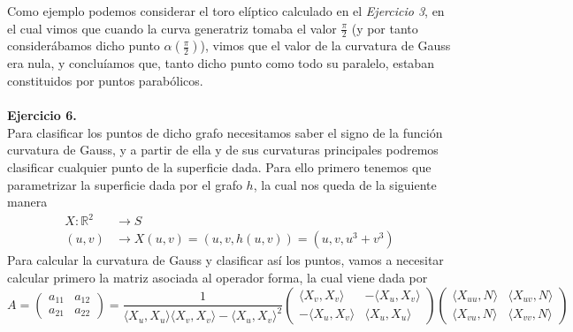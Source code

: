\documentclass[fleqn]{article}
\def\R{\mathds{R}}
\begin{document}
    Como ejemplo podemos considerar el toro elíptico calculado en el \textit{Ejercicio 3}, en el cual vimos que 
    cuando la curva generatriz tomaba el valor $\frac{\pi}{2}$ (y por tanto considerábamos dicho punto $\alpha(\frac{\pi}{2})$), vimos que el valor de la curvatura de Gauss era nula, y concluíamos
    que, tanto dicho punto como todo su paralelo, estaban constituidos por puntos parabólicos. \\ \\

    \textbf{Ejercicio 6. } \\

    Para clasificar los puntos de dicho grafo necesitamos saber el signo de la función curvatura de Gauss, y a partir de ella y de sus curvaturas principales podremos clasificar cualquier punto
    de la superficie dada. Para ello primero tenemos que parametrizar la superficie dada por el grafo $h$, la cual nos queda de la siguiente manera
    \begin{equation*}
        \begin{aligned}
            X: \R^2 &\longrightarrow S \\
            (u,v) &\longrightarrow X(u, v) = (u, v, h(u,v)) = (u, v, u^3 + v^3)
        \end{aligned}
    \end{equation*}
    Para calcular la curvatura de Gauss y clasificar así los puntos, vamos a necesitar calcular primero la matriz asociada al operador forma, la cual viene dada por 
    \begin{equation*}
        A =
        \begin{pmatrix}
            a_{11} & a_{12} \\
            a_{21} & a_{22}
        \end{pmatrix}
        = \frac{1}{\langle X_u, X_u \rangle \langle X_v, X_v \rangle - \langle X_u, X_v \rangle ^2}
        \begin{pmatrix}
            \langle X_v, X_v \rangle & - \langle X_u, X_v \rangle \\
            -\langle X_u, X_v \rangle & \langle X_u, X_u \rangle
        \end{pmatrix}
        \begin{pmatrix}
            \langle X_{uu}, N \rangle & \langle X_{uv}, N \rangle \\
            \langle X_{vu}, N \rangle & \langle X_{vv}, N \rangle
        \end{pmatrix}
    \end{equation*}
\end{document}
